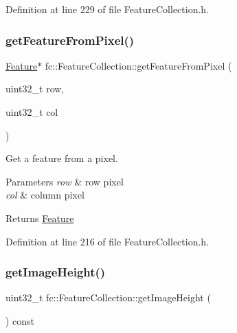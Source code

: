 Definition at line 229 of file Feature\+Collection.\+h.

\mbox{\label{classfc_1_1FeatureCollection_a8b4f1f1b8e74be75c4a9da180d1d8e21}} 
\subsubsection{\texorpdfstring{get\+Feature\+From\+Pixel()}{getFeatureFromPixel()}}
{\footnotesize\ttfamily \hyperlink{classfc_1_1Feature}{Feature}$\ast$ fc\+::\+Feature\+Collection\+::get\+Feature\+From\+Pixel (\begin{DoxyParamCaption}\item[{uint32\+\_\+t}]{row,  }\item[{uint32\+\_\+t}]{col }\end{DoxyParamCaption})\hspace{0.3cm}{\ttfamily [inline]}}



Get a feature from a pixel. 


\begin{DoxyParams}{Parameters}
{\em row} & row pixel \\
\hline
{\em col} & column pixel \\
\hline
\end{DoxyParams}
\begin{DoxyReturn}{Returns}
\hyperlink{classfc_1_1Feature}{Feature} 
\end{DoxyReturn}


Definition at line 216 of file Feature\+Collection.\+h.

\mbox{\label{classfc_1_1FeatureCollection_a592c9d590dda0d84725ca48a0463143b}} 
\subsubsection{\texorpdfstring{get\+Image\+Height()}{getImageHeight()}}
{\footnotesize\ttfamily uint32\+\_\+t fc\+::\+Feature\+Collection\+::get\+Image\+Height (\begin{DoxyParamCaption}{ }\end{DoxyParamCaption}) const\hspace{0.3cm}{\ttfamily [inline]}}




